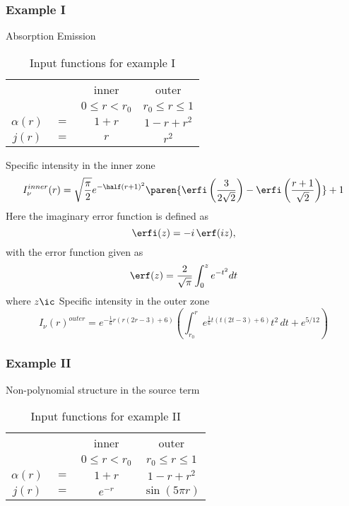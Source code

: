\subsubsection{Example I}
Absorption
Emission
\begin{table}[htdp]
\caption[Input functions for example I]{Input functions for example I}
\begin{center}
\begin{tabular}{cccc}
%
 && inner & outer \\
 && $0\le r < r_{0}$ & $r_{0}\le r \le 1$ \\\hline
% 
  $\alpha(r)$ & $=$ & $1+r$ & $1-r+r^{2}$ \\
% 
  $j(r)$ & $=$ & $r$ & $r^{2}$
%
\end{tabular}
\end{center}
\label{tab:fcns:I}
\end{table}
%
Specific intensity in the inner zone
  \begin{equation}
    I_{\nu}^{inner}(r) = \sqrt{\frac{\pi }{2}} e^{-\half (r+1)^2} \paren{\erfi\left(\frac{3}{2 \sqrt{2}}\right)-\erfi\left(\frac{r+1}{\sqrt{2}}\right)}+1
  \end{equation}
Here the imaginary error function is defined as
  \begin{equation}
    \erfi (z) = -i \,\erf (iz) ,
  \end{equation}
with the error function given as
  \begin{equation}
    \erf (z) = \frac{2}{\sqrt{\pi}} \int_{0}^{z} e^{-t^{2}} dt
  \end{equation}
where $z\ic$
Specific intensity in the outer zone
  \begin{equation}
    I_{\nu}(r)^{outer} = e^{-\frac{1}{6} r (r (2 r-3)+6)} \left(\int_{r_{0}}^r e^{\frac{1}{6} t (t (2 t-3)+6)} t^2 \, dt+e^{5/12}\right)
  \end{equation}


\subsubsection{Example II}
Non-polynomial structure in the source term
\begin{table}[htdp]
\caption[Input functions for example II]{Input functions for example II}
\begin{center}
\begin{tabular}{cccc}
%
 && inner & outer \\
 && $0\le r < r_{0}$ & $r_{0}\le r \le 1$ \\\hline
% 
  $\alpha(r)$ & $=$ & $1+r$ & $1-r+r^{2}$ \\
% 
  $j(r)$ & $=$ & $e^{-r}$ & $\sin(5\pi r)$
%
\end{tabular}
\end{center}
\label{tab:fcns:II}
\end{table}%

